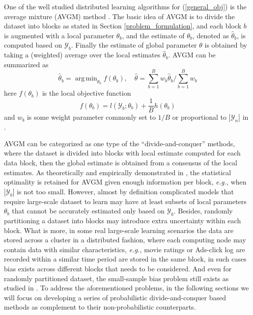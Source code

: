 \documentclass{article}
\DeclareMathOperator*{\argmin}{arg\,min}
\newcommand{\eg}[0]{\emph{e.g., }}
\newcommand{\1}[0]{\ensuremath{\boldsymbol{1}}\xspace}
\begin{document}
One of the well studied distributed learning algorithms for (\ref{general_obj}) is the average mixture (AVGM) method \cite{Mann2009, Zinkevich2010, YZhang2012}. The basic idea of AVGM is to divide the dataset into blocks as stated in Section \ref{problem_formulation}, and each block $b$ is augmented with a local parameter $\theta_b$, and the estimate of $\theta_b$, denoted as $\hat\theta_b$, is computed based on $\mathcal{Y}_b$. Finally the estimate of global parameter $\theta$ is obtained by taking a (weighted) average over the local estimates $\hat\theta_b$. AVGM can be summarized as
\begin{equation}\label{avgm}
\hat\theta_b = \textstyle\argmin_{\theta_b}f(\theta_b), \quad \hat\theta = \textstyle\sum_{b=1}^B w_b\hat\theta_b/\sum_{b=1}^Bw_b
\end{equation} 
here $f(\theta_b)$ is the local objective function
\begin{equation}\label{avgm_local}
\textstyle f(\theta_b) = l(\mathcal{Y}_b; \theta_b)+\frac{1}{B}h(\theta_b)
\end{equation}
and $w_b$ is some weight parameter commonly set to $1/B$ \cite{Mann2009, Zinkevich2010} or proportional to $|\mathcal{Y}_n|$ in \cite{YZhang2012}. 

AVGM can be categorized as one type of the ``divide-and-conquer'' methods, where the dataset is divided into blocks with local estimate computed for each data block, then the global estimate is obtained from a consensus of the local estimates. As theoretically and empirically demonstrated in \cite{YZhang2012}, the statistical optimality is retained for AVGM given enough information per block, \eg when $|\mathcal{Y}_b|$ is not too small. However, almost by definition complicated models that require large-scale dataset to learn may have at least subsets of local parameters $\theta_b$ that cannot be accurately estimated only based on $\mathcal{Y}_b$. Besides, randomly partitioning a dataset into blocks may introduce extra uncertainty within each block. What is more, in some real large-scale learning scenarios  the data are stored across a cluster in a distributed fashion, where each computing node may contain data with similar characteristics, \eg movie ratings or Ads-click log are recorded within a similar time period are stored in the same block, in such cases bias exists across different blocks that needs to be considered. And even for randomly partitioned dataset, the small-sample bias problem still exists as studied in \cite{YZhang2012, Scott2013}. To address the aforementioned problems, in the following sections we will focus on developing a series of probabilistic divide-and-conquer based methods as complement to their non-probabilistic counterparts.
\end{document}
